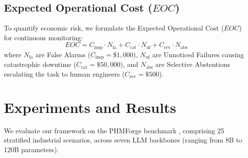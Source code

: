 \documentclass[10pt,twocolumn,a4paper]{article}
\begin{document}
\subsection{Expected Operational Cost ($EOC$)}
To quantify economic risk, we formulate the Expected Operational Cost ($EOC$) for continuous monitoring:
\begin{equation}
EOC = C_{\text{insp}} \cdot N_{\text{fa}} + C_{\text{cat}} \cdot N_{\text{uf}} + C_{\text{rev}} \cdot N_{\text{abs}}
\end{equation}
where $N_{\text{fa}}$ are False Alarms ($C_{\text{insp}} = \$1,000$), $N_{\text{uf}}$ are Unnoticed Failures causing catastrophic downtime ($C_{\text{cat}} = \$50,000$), and $N_{\text{abs}}$ are Selective Abstentions escalating the task to human engineers ($C_{\text{rev}} = \$500$). 

\section{Experiments and Results}
We evaluate our framework on the PHMForge benchmark \cite{das2025phmforge}, comprising 25 stratified industrial scenarios, across seven LLM backbones (ranging from 8B to 120B parameters). 
\end{document}
